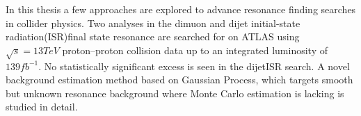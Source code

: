 %
%
%
%
%
%
In this thesis a few approaches are explored to advance resonance finding searches in collider physics. Two analyses in the dimuon and dijet initial-state radiation(ISR)final state resonance are searched for on ATLAS using $\sqrt{s}=13 TeV$ proton--proton collision data up to an integrated luminosity of $139 fb^{-1}$. No statistically significant excess is seen in the dijetISR search. A novel background estimation method based on Gaussian Process, which targets smooth but unknown resonance background where Monte Carlo estimation is lacking is studied in detail. 
